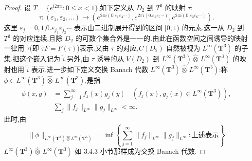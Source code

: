 \begin{proof}
设 $T = \{e^{i2\pi x}: 0 \leq x < 1\}$,如下定义从 $D_{2}$ 到 $T^{3}$ 的映射 $\tau$:
\begin{equation*}
\tau: (\varepsilon_{1}, \varepsilon_{2}, \ldots) \to (e^{2\pi i(0.\varepsilon_{1}\varepsilon_{4}\cdots)}, e^{2\pi i(0.\varepsilon_{2}\varepsilon_{5}\cdots)}, e^{2\pi i(0.\varepsilon_{3}\varepsilon_{6}\cdots)}).
\end{equation*}
这里 $\varepsilon_{j} = 0, 1$,$0.\varepsilon_{j_{1}}\varepsilon_{j_{2}}\cdots$ 表示由二进制展开得到的区间 $[0, 1)$ 的元素.这一从 $D_{2}$ 到 $T^{3}$ 的对应连续,且除 $D_{2}$ 的可数个集合外是一一的.由此在函数空间之间诱导的映射一律用 $\widetilde{\tau}$(即 $\widetilde{\tau}F = F(\tau)$)表示.又由 $\tau$ 的对应,$C(D_{2})$ 自然被视为 $L^{\infty}(\mathbf{T}^{3})$ 的子集.把这个嵌入记为 $\widetilde{i}$.另外,由 $\tau$ 诱导的从 $V(D_{2})$ 到 $L^{\infty}(\mathbf{T}^{3}) \widehat{\otimes}\, L^{\infty}(\mathbf{T}^{3})$ 的映射也用 $\widetilde{i}$ 表示.进一步如下定义交换 Banach 代数 $L^{\infty}(\mathbf{T}^{3}) \widehat{\otimes}\, L^{\infty}(\mathbf{T}^{3})$:称 $\phi \in L^{\infty}(\mathbf{T}^{3}) \widehat{\otimes}\, L^{\infty}(\mathbf{T}^{3})$,是指
\begin{align*}
\phi(x, y) &= \sum_{j=1}^{\infty}f_{j}(x)g_{j}(y) \quad (f_{j}(x), g_{j}(x) \in L^{\infty}(\mathbf{T}^{3})),\\
&\sum_{j}\|f_{j}\|_{L^{\infty}}\|g_{j}\|_{L^{\infty}} < \infty.
\end{align*}
此时,由
\begin{equation*}
\|\phi\|_{L^{\infty}(\mathbf{T}^{3}) \widehat{\otimes} L^{\infty}(\mathbf{T}^{3})} = \inf\left\{\sum_{j=1}^{\infty}\|f_{j}\|_{L^{\infty}}\|g_{j}\|_{L^{\infty}}: \text{上述表示}\right\}
\end{equation*}
$L^{\infty}(\mathbf{T}^{3}) \widehat{\otimes}\, L^{\infty}(\mathbf{T}^{3})$ 如 3.4.3 小节那样成为交换 Banach 代数.


\end{proof}
